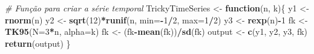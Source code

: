 \documentclass[
]{article}
\newenvironment{Shaded}{\begin{snugshade}}{\end{snugshade}}
\newcommand{\AttributeTok}[1]{\textcolor[rgb]{0.13,0.29,0.53}{#1}}
\newcommand{\CommentTok}[1]{\textcolor[rgb]{0.56,0.35,0.01}{\textit{#1}}}
\newcommand{\ControlFlowTok}[1]{\textcolor[rgb]{0.13,0.29,0.53}{\textbf{#1}}}
\newcommand{\DecValTok}[1]{\textcolor[rgb]{0.00,0.00,0.81}{#1}}
\newcommand{\FunctionTok}[1]{\textcolor[rgb]{0.13,0.29,0.53}{\textbf{#1}}}
\newcommand{\NormalTok}[1]{#1}
\newcommand{\OtherTok}[1]{\textcolor[rgb]{0.56,0.35,0.01}{#1}}
\newcommand{\SpecialCharTok}[1]{\textcolor[rgb]{0.81,0.36,0.00}{\textbf{#1}}}
\begin{document}
\begin{Shaded}
\begin{Highlighting}[]
\CommentTok{\# Função para criar a série temporal}
\NormalTok{TrickyTimeSeries }\OtherTok{\textless{}{-}} \ControlFlowTok{function}\NormalTok{(n, k)\{}
\NormalTok{  y1 }\OtherTok{\textless{}{-}} \FunctionTok{rnorm}\NormalTok{(n)}
\NormalTok{  y2 }\OtherTok{\textless{}{-}} \FunctionTok{sqrt}\NormalTok{(}\DecValTok{12}\NormalTok{)}\SpecialCharTok{*}\FunctionTok{runif}\NormalTok{(n, }\AttributeTok{min=}\SpecialCharTok{{-}}\DecValTok{1}\SpecialCharTok{/}\DecValTok{2}\NormalTok{, }\AttributeTok{max=}\DecValTok{1}\SpecialCharTok{/}\DecValTok{2}\NormalTok{)}
\NormalTok{  y3 }\OtherTok{\textless{}{-}} \FunctionTok{rexp}\NormalTok{(n)}\SpecialCharTok{{-}}\DecValTok{1}
\NormalTok{  fk }\OtherTok{\textless{}{-}} \FunctionTok{TK95}\NormalTok{(}\AttributeTok{N=}\DecValTok{3}\SpecialCharTok{*}\NormalTok{n, }\AttributeTok{alpha=}\NormalTok{k)}
\NormalTok{  fk }\OtherTok{\textless{}{-}}\NormalTok{ (fk}\SpecialCharTok{{-}}\FunctionTok{mean}\NormalTok{(fk))}\SpecialCharTok{/}\FunctionTok{sd}\NormalTok{(fk)}
\NormalTok{  output }\OtherTok{\textless{}{-}} \FunctionTok{c}\NormalTok{(y1, y2, y3, fk)}
  \FunctionTok{return}\NormalTok{(output)}
\NormalTok{\}}


\end{Highlighting}
\end{Shaded}
\end{document}
